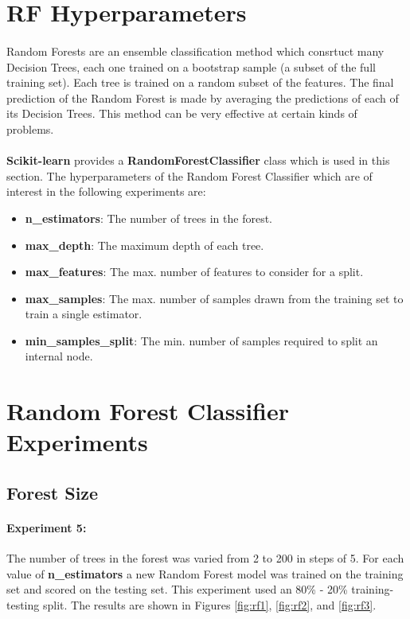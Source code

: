 \documentclass[12pt, letterpaper]{article}
\begin{document}
\section{RF Hyperparameters}

\paragraph*{}Random Forests are an ensemble classification method which consrtuct
many Decision Trees, each one trained on a bootstrap sample (a subset of the full
training set). Each tree is trained on a random subset of the features. The final
prediction of the Random Forest is made by averaging the predictions of each of 
its Decision Trees. This method can be very effective at certain kinds of problems.

\paragraph*{}\textbf{Scikit-learn} provides a \textbf{RandomForestClassifier} class
which is used in this section. The hyperparameters of the Random Forest Classifier
which are of interest in the following experiments are:

\begin{itemize}
    \item \textbf{n\_estimators}: The number of trees in the forest.
    \item \textbf{max\_depth}: The maximum depth of each tree.
    \item \textbf{max\_features}: The max. number of features to consider for a split.
    \item \textbf{max\_samples}: The max. number of samples drawn from the training set to train a single estimator.
    \item \textbf{min\_samples\_split}: The min. number of samples required to split an internal node.
\end{itemize}

\section{Random Forest Classifier Experiments}

\subsection{Forest Size}

\paragraph*{Experiment 5:} The number of trees in the forest was
varied from 2 to 200 in steps of 5. For each value of \textbf{n\_estimators} a new
Random Forest model was trained on the training set and scored on the testing set.
This experiment used an 80\% - 20\% training-testing split. The results are shown
in Figures \ref{fig:rf1}, \ref{fig:rf2}, and \ref{fig:rf3}.
\end{document}
